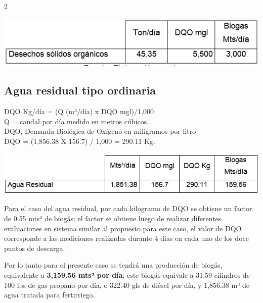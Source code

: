 \documentclass[11pt,spanish,Letterpaper,openany]{book}
\begin{document}
\begin {multicols}{2}
\begin {flushleft}
\begin{minipage}[c]{\columnwidth}
\includegraphics[width=1\linewidth]{images/201901-gfong-imagen05}

\end{minipage}

\end {flushleft}

\hypertarget{agua-residual-tipo-ordinaria}{%
\subsection{Agua residual tipo ordinaria}\label{agua-residual-tipo-ordinaria}}

\begin {flushleft}

DQO Kg/día = (Q (m³/día) x DQO mgl)/1,000\\
Q = caudal por día medido en metros cúbicos.\\
DQO, Demanda Biológica de Oxígeno en miligramos por litro\\
DQO = (1,856.38 X 156.7) / 1,000 = 290.11 Kg.

\noindent\begin{minipage}[c]{\columnwidth}

\includegraphics[width=1\linewidth]{images/201901-gfong-imagen06}

\end{minipage}

\end {flushleft}

Para el caso del agua residual, por cada kilogramo de DQO se obtiene un factor de 0.55 mts³ de biogás; el factor se obtiene luego de realizar diferentes evaluaciones en sistema similar al propuesto para este caso, el valor de DQO corresponde a las mediciones realizadas durante 4 días en cada uno de los doce puntos de descarga.

Por lo tanto para el presente caso se tendrá una producción de biogás, equivalente a \textbf{3,159.56 mts³ por día}; este biogás equivale a 31.59 cilindros de 100 lbs de gas propano por día, o 322.40 gls de diésel por día, y 1,856.38 m³ de agua tratada para fertirriego.


\end{multicols}
\end{document}
